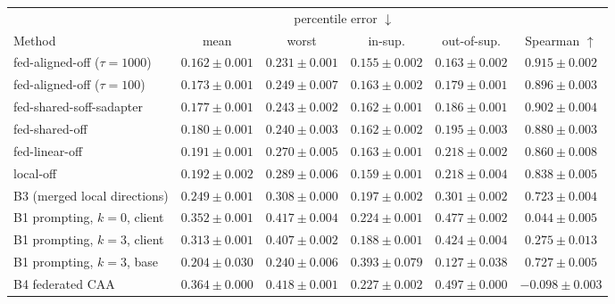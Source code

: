 \begin{table}[t]
  \centering
  \small
  \begin{tabular}{lccccc}
    \toprule
    & \multicolumn{4}{c}{percentile error $\downarrow$} & \\
    \cmidrule(lr){2-5}
    Method & mean & worst & in-sup. & out-of-sup. & Spearman $\uparrow$ \\
    \midrule
    fed-aligned-off ($\tau{=}1000$) & $\mathbf{0.162} \pm 0.001$ & $\mathbf{0.231} \pm 0.001$ & $\mathbf{0.155} \pm 0.002$ & $\mathbf{0.163} \pm 0.002$ & $\mathbf{0.915} \pm 0.002$ \\
    fed-aligned-off ($\tau{=}100$) & $0.173 \pm 0.001$ & $0.249 \pm 0.007$ & $0.163 \pm 0.002$ & $0.179 \pm 0.001$ & $0.896 \pm 0.003$ \\
    fed-shared-soff-sadapter & $0.177 \pm 0.001$ & $0.243 \pm 0.002$ & $0.162 \pm 0.001$ & $0.186 \pm 0.001$ & $0.902 \pm 0.004$ \\
    fed-shared-off & $0.180 \pm 0.001$ & $0.240 \pm 0.003$ & $0.162 \pm 0.002$ & $0.195 \pm 0.003$ & $0.880 \pm 0.003$ \\
    fed-linear-off & $0.191 \pm 0.001$ & $0.270 \pm 0.005$ & $0.163 \pm 0.001$ & $0.218 \pm 0.002$ & $0.860 \pm 0.008$ \\
    local-off & $0.192 \pm 0.002$ & $0.289 \pm 0.006$ & $0.159 \pm 0.001$ & $0.218 \pm 0.004$ & $0.838 \pm 0.005$ \\
    \midrule
    B3 (merged local directions) & $0.249 \pm 0.001$ & $0.308 \pm 0.000$ & $0.197 \pm 0.002$ & $0.301 \pm 0.002$ & $0.723 \pm 0.004$ \\
    B1 prompting, $k{=}0$, client & $0.352 \pm 0.001$ & $0.417 \pm 0.004$ & $0.224 \pm 0.001$ & $0.477 \pm 0.002$ & $0.044 \pm 0.005$ \\
    B1 prompting, $k{=}3$, client & $0.313 \pm 0.001$ & $0.407 \pm 0.002$ & $0.188 \pm 0.001$ & $0.424 \pm 0.004$ & $0.275 \pm 0.013$ \\
    B1 prompting, $k{=}3$, base & $0.204 \pm 0.030$ & $0.240 \pm 0.006$ & $0.393 \pm 0.079$ & $0.127 \pm 0.038$ & $0.727 \pm 0.005$ \\
    B4 federated CAA & $0.364 \pm 0.000$ & $0.418 \pm 0.001$ & $0.227 \pm 0.002$ & $0.497 \pm 0.000$ & $-0.098 \pm 0.003$ \\

\end{tabular}
\end{table}
